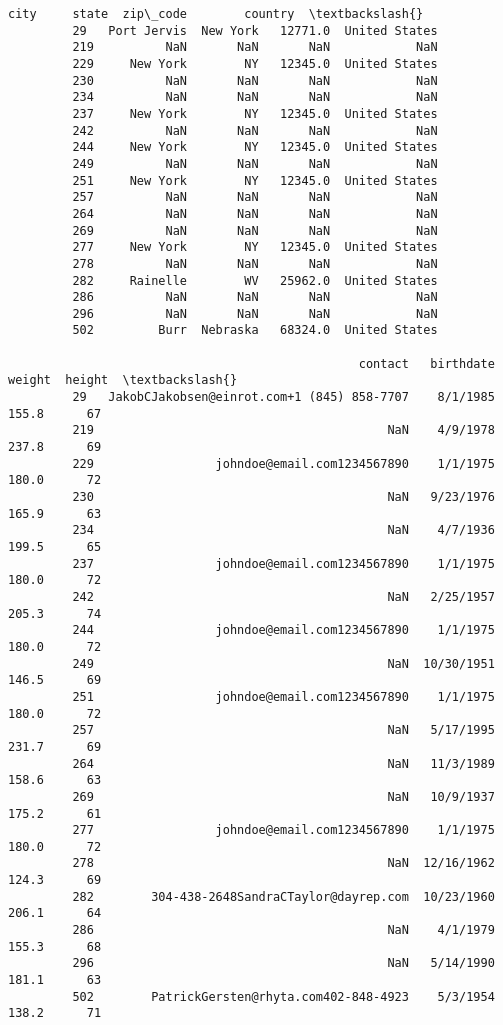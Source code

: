 \documentclass[11pt]{article}
\begin{document}
\begin{Verbatim}[commandchars=\\\{\}]
                     city     state  zip\_code        country  \textbackslash{}
         29   Port Jervis  New York   12771.0  United States   
         219          NaN       NaN       NaN            NaN   
         229     New York        NY   12345.0  United States   
         230          NaN       NaN       NaN            NaN   
         234          NaN       NaN       NaN            NaN   
         237     New York        NY   12345.0  United States   
         242          NaN       NaN       NaN            NaN   
         244     New York        NY   12345.0  United States   
         249          NaN       NaN       NaN            NaN   
         251     New York        NY   12345.0  United States   
         257          NaN       NaN       NaN            NaN   
         264          NaN       NaN       NaN            NaN   
         269          NaN       NaN       NaN            NaN   
         277     New York        NY   12345.0  United States   
         278          NaN       NaN       NaN            NaN   
         282     Rainelle        WV   25962.0  United States   
         286          NaN       NaN       NaN            NaN   
         296          NaN       NaN       NaN            NaN   
         502         Burr  Nebraska   68324.0  United States   
         
                                                 contact   birthdate  weight  height  \textbackslash{}
         29   JakobCJakobsen@einrot.com+1 (845) 858-7707    8/1/1985   155.8      67   
         219                                         NaN    4/9/1978   237.8      69   
         229                 johndoe@email.com1234567890    1/1/1975   180.0      72   
         230                                         NaN   9/23/1976   165.9      63   
         234                                         NaN    4/7/1936   199.5      65   
         237                 johndoe@email.com1234567890    1/1/1975   180.0      72   
         242                                         NaN   2/25/1957   205.3      74   
         244                 johndoe@email.com1234567890    1/1/1975   180.0      72   
         249                                         NaN  10/30/1951   146.5      69   
         251                 johndoe@email.com1234567890    1/1/1975   180.0      72   
         257                                         NaN   5/17/1995   231.7      69   
         264                                         NaN   11/3/1989   158.6      63   
         269                                         NaN   10/9/1937   175.2      61   
         277                 johndoe@email.com1234567890    1/1/1975   180.0      72   
         278                                         NaN  12/16/1962   124.3      69   
         282        304-438-2648SandraCTaylor@dayrep.com  10/23/1960   206.1      64   
         286                                         NaN    4/1/1979   155.3      68   
         296                                         NaN   5/14/1990   181.1      63   
         502        PatrickGersten@rhyta.com402-848-4923    5/3/1954   138.2      71   
         

\end{Verbatim}
\end{document}
